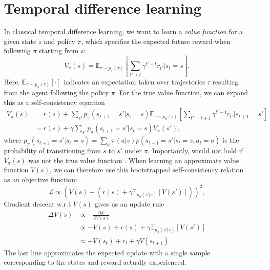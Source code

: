 \section{Temporal difference learning}
\label{sec:temporal_difference}

In classical temporal difference learning, we want to learn a \emph{value function} for a given state $s$ and policy $\pi$, which specifies the expected future reward when following $\pi$ starting from $s$:
\begin{equation}
    \label{eq:V-values}
    V_{\pi}(s) = \mathbb{E}_{\tau \sim p_\pi(\tau)} \left [ \sum_{t' \geq t} \gamma^{t' - t} r_{t'} | s_t = s \right ].
\end{equation}
Here, $\mathbb{E}_{\tau \sim p_\pi(\tau)} [ \cdot ]$ indicates an expectation taken over trajectories $\tau$ resulting from the agent following the policy $\pi$.
For the true value function, we can expand this as a self-consistency equation
\begin{align}
    V_{\pi}(s) &= r(s) + \sum_{s'} p_{\pi}(s_{t+1} = s' | s_t = s) \mathbb{E}_{\tau \sim p_\pi(\tau)} \left [ \sum_{t' = t+1} \gamma^{t' - t} r_{t'} | s_{t+1} = s' \right ] \\
    &=  r(s) + \gamma \sum_{s'} p_{\pi}(s_{t+1} = s' | s_t = s) V_{\pi}(s'),
    \label{eq:value_expansion}
\end{align}
where $p_{\pi}(s_{t+1} = s' | s_t = s) = \sum_a \pi(a|s) p(s_{t+1} = s' | s_t = s, a_t = a)$ is the probability of transitioning from $s$ to $s'$ under $\pi$.
Importantly,  would not hold if $V_{\pi}(s)$ was not the true value function \citep{sutton2018reinforcement}.
%
When learning an approximate value function $V(s)$, we can therefore use this bootstrapped self-consistency relation as an objective function:
\begin{equation}
    \mathcal{L} \propto \left (  V(s) - \left ( r(s) + \gamma \mathbb{E}_{p_\pi(s'|s)} \left [ V(s') \right ] \right ) \right )^2,
\end{equation}
Gradient descent w.r.t $V(s)$ gives us an update rule
\begin{align}
    \Delta V(s) &\propto - \frac{\partial \mathcal{L}}{\partial V(s)}\\
    \label{eq:TD-learning_exp}
    &\propto - V(s) + r(s) + \gamma \mathbb{E}_{p_\pi(s'|s)} \left [ V(s') \right ]\\
    \label{eq:TD-learning}
    &\approx - V(s_t) + r_t + \gamma V(s_{t+1}).
\end{align}
The last line approximates the expected update with a single sample corresponding to the states and reward actually experienced.
